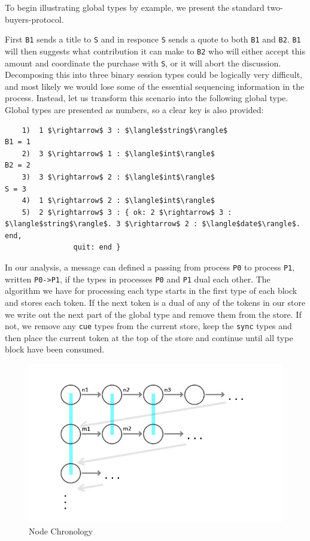 \documentclass[11pt, abstracton, twoside]{scrartcl}
\begin{document}
To begin illustrating global types by example, we present the standard 
two-buyers-protocol.

First \texttt{B1} sends a title to \texttt{S} and in responce \texttt{S}
sends a quote to both \texttt{B1} and \texttt{B2}. \texttt{B1} will then
suggests what contribution it can make to \texttt{B2} who will either
accept this amount and coordinate the purchase with \texttt{S}, or it will
abort the discussion. Decomposing this into three binary session types
could be logically very difficult, and most likely we would lose some of
the essential sequencing information in the process. Instead, let us transform
this scenario into the following global type. Global types are presented as
numbers, so a clear key is also provided:
\\
\begin{lstlisting}
    1)  1 $\rightarrow$ 3 : $\langle$string$\rangle$                         B1 = 1
    2)  3 $\rightarrow$ 1 : $\langle$int$\rangle$                            B2 = 2
    3)  3 $\rightarrow$ 2 : $\langle$int$\rangle$                             S = 3
    4)  1 $\rightarrow$ 2 : $\langle$int$\rangle$
    5)  2 $\rightarrow$ 3 : { ok: 2 $\rightarrow$ 3 : $\langle$string$\rangle$. 3 $\rightarrow$ 2 : $\langle$date$\rangle$. end,
                quit: end }
\end{lstlisting}

In our analysis, a message can defined a passing from process \texttt{P0}
to process \texttt{P1}, written \texttt{P0->P1}, if the types in processes 
\texttt{P0} and \texttt{P1} dual each other. The algorithm we have for processing
each type starts in the first type of each block and stores each token. If
the next token is a dual of any of the tokens in our store we write out the
next part of the global type and remove them from the store. If not, we
remove any \texttt{cue} types from the current store, keep the \texttt{sync} 
types and then place the current token at the top of the store and continue 
until all type block have been consumed.

\begin{figure}[h!]
	\centering
	\includegraphics[width=\textwidth]{images/GraphOneFix.jpg}
	\caption{Node Chronology} \label{nodegraphone}
\end{figure}
\end{document}
